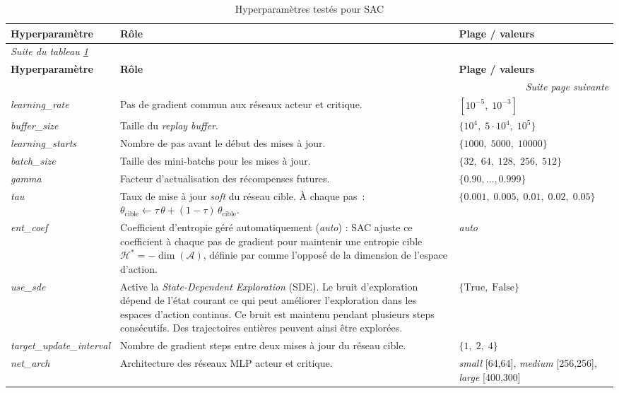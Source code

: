 \begingroup
\footnotesize
\setlength{\tabcolsep}{8pt}
\renewcommand{\arraystretch}{1.4}
\begin{longtable}{%
  p{\hpColA}%
  p{\dimexpr\textwidth - \hpColA - \hpColC - 6\tabcolsep\relax}%
  p{\hpColC}%
}
  \caption{Hyperparamètres testés pour SAC}
  \label{tab:hparams_sac}\\
  \toprule
  \textbf{Hyperparamètre} & \textbf{Rôle} & \textbf{Plage / valeurs}\\
  \midrule
\endfirsthead
  \multicolumn{3}{l}{\footnotesize\itshape Suite du tableau \ref{tab:hparams_sac}}\\[2pt]
  \toprule
  \textbf{Hyperparamètre} & \textbf{Rôle} & \textbf{Plage / valeurs}\\
  \midrule
\endhead
  \midrule
  \multicolumn{3}{r}{\footnotesize\itshape Suite page suivante}\\
\endfoot
  \bottomrule
\endlastfoot

\textit{learning\_rate}
  & Pas de gradient commun aux réseaux acteur et critique.
  & $[10^{-5},\;10^{-3}]$ \\[4pt]
\textit{buffer\_size}
  & Taille du \textit{replay buffer}.
  & $\{10^4,\;5{\cdot}10^4,\;10^5\}$ \\[4pt]
\textit{learning\_starts}
  & Nombre de pas avant le début des mises à jour.
  & $\{1000,\;5000,\;10000\}$ \\[4pt]
\textit{batch\_size}
  & Taille des mini-batchs pour les mises à jour.
  & $\{32,\;64,\;128,\;256,\;512\}$ \\[4pt]
\textit{gamma}
  & Facteur d'actualisation des récompenses futures.
  & $\{0.90,\ldots,0.999\}$ \\[4pt]
\textit{tau}
  & Taux de mise à jour \textit{soft} du réseau cible.
    À chaque pas~:
    $\theta_{\text{cible}} \leftarrow \tau\,\theta + (1-\tau)\,\theta_{\text{cible}}$.
  & $\{0.001,\;0.005,\;0.01,\;0.02,\;0.05\}$ \\[4pt]
\textit{ent\_coef}
  & Coefficient d'entropie géré automatiquement (\textit{auto}) : SAC
    ajuste ce coefficient à chaque pas de gradient pour maintenir une
    entropie cible $\mathcal{H}^* = -\dim(\mathcal{A})$, définie par
    \cite{haarnojaSoftActorCriticAlgorithms2019} comme l'opposé de la dimension de l'espace d'action.
  & \textit{auto} \\[4pt]
\textit{use\_sde}
  & Active la \textit{State-Dependent Exploration} (SDE). Le bruit d'exploration dépend de l'état courant
    ce qui peut améliorer l'exploration dans les
    espaces d'action continus. Ce bruit est maintenu pendant plusieurs steps consécutifs. Des trajectoires entières peuvent ainsi être explorées.
  & $\{\text{True},\;\text{False}\}$ \\[4pt]
\textit{target\_update\_interval}
  & Nombre de gradient steps entre deux mises à jour du réseau cible.
  & $\{1,\;2,\;4\}$ \\[4pt]
\textit{net\_arch}
  & Architecture des réseaux MLP acteur et critique.
  & \textit{small} [64,64],\newline
    \textit{medium} [256,256],\newline
    \textit{large} [400,300] \\
\end{longtable}
